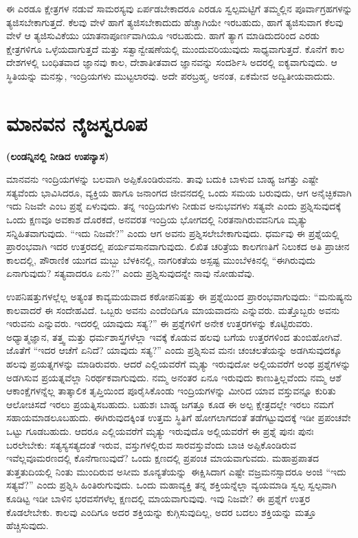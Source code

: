 ಈ ಎರಡೂ ಕ್ಷೇತ್ರಗಳ ನಡುವೆ ಸಾಮರಸ್ಯವು ಏರ್ಪಡಬೇಕಾದರೂ ಎರಡೂ ಸ್ವಲ್ಪಮಟ್ಟಿಗೆ ತಮ್ಮಲ್ಲಿನ ಪೂರ್ವಾಗ್ರಹಗಳನ್ನು ತ್ಯಜಿಸಬೇಕಾಗುತ್ತದೆ. ಕೆಲವು ವೇಳೆ ಹಾಗೆ ತ್ಯಜಿಸಬೇಕಾದುದು ಹೆಚ್ಚಾಗಿಯೇ ಇರಬಹುದು, ಹಾಗೆ ತ್ಯಜಿಸುವಾಗ ಕೆಲವು ವೇಳೆ ಆ ತ್ಯಜಿಸುವಿಕೆಯು ಯಾತನಾಪೂರ್ಣವಾಗಿಯೂ ಇರಬಹುದು. ಹಾಗೆ ತ್ಯಾಗ ಮಾಡಿದುದರಿಂದ ಎರಡು ಕ್ಷೇತ್ರಗಳಿಗೂ ಒಳ್ಳೆಯದಾಗುತ್ತದೆ ಮತ್ತು ಸತ್ವಾನ್ವೇಷಣೆಯಲ್ಲಿ ಮುಂದುವರಿಯುವುದು ಸಾಧ್ಯವಾಗುತ್ತದೆ. ಕೊನೆಗೆ ಕಾಲ ದೇಶಗಳಲ್ಲಿ ಬಂಧಿತವಾದ ಜ್ಞಾನವು ಕಾಲ, ದೇಶಾತೀತವಾದ ಜ್ಞಾನವನ್ನು ಸಂದರ್ಶಿಸಿ ಅದರಲ್ಲಿ ಐಕ್ಯವಾಗುವುದು. ಆ ಸ್ಥಿತಿಯನ್ನು ಮನಸ್ಸು, ಇಂದ್ರಿಯಗಳು ಮುಟ್ಟಲಾರವು. ಅದೇ ಪರಬ್ರಹ್ಮ, ಅನಂತ, ಏಕಮೇವ ಅದ್ವಿತೀಯವಾದುದು.

\chapter{ಮಾನವನ ನೈಜಸ್ವರೂಪ}%

\centerline{\textbf{(ಲಂಡನ್ನಿನಲ್ಲಿ ನೀಡಿದ ಉಪನ್ಯಾಸ)}}

ಮಾನವನು ಇಂದ್ರಿಯಗಳನ್ನು ಬಲವಾಗಿ ಅಪ್ಪಿಕೊಂಡಿರುವನು. ತಾವು ಬದುಕಿ ಬಾಳುವ ಬಾಹ್ಯ ಜಗತ್ತು ಎಷ್ಟೇ ಸತ್ಯವೆಂದು ಭಾವಿಸಿದರೂ, ವ್ಯಕ್ತಿಯ ಹಾಗೂ ಜನಾಂಗದ ಜೀವನದಲ್ಲಿ ಒಂದು ಸಮಯ ಬರುವುದು, ಆಗ ಅನೈಚ್ಛಿಕವಾಗಿ ಇದು ನಿಜವೇ ಎಂಬ ಪ್ರಶ್ನೆ ಏಳುವುದು. ತನ್ನ ಇಂದ್ರಿಯಗಳು ನೀಡುವ ಅನುಭವಗಳು ಸತ್ಯವೇ ಎಂದು ಪ್ರಶ್ನಿಸುವುದಕ್ಕೆ ಒಂದು ಕ್ಷಣವೂ ಅವಕಾಶ ದೊರಕದೆ, ಅನವರತ ಇಂದ್ರಿಯ ಭೋಗದಲ್ಲಿ ನಿರತನಾಗಿರುವವನಿಗೂ ಮೃತ್ಯು ಸನ್ನಿಹಿತವಾಗುವುದು. “ಇದು ನಿಜವೇ?” ಎಂದು ಆಗ ಅವನು ಪ್ರಶ್ನಿಸಲೇಬೇಕಾಗುವುದು. ಧರ್ಮವು ಈ ಪ್ರಶ್ನೆಯಲ್ಲಿ ಪ್ರಾರಂಭವಾಗಿ ಇದರ ಉತ್ತರದಲ್ಲಿ ಪರ್ಯವಸಾನವಾಗುವುದು. ಲಿಖಿತ ಚರಿತ್ರೆಯ ಕಾಲಗಣತಿಗೆ ನಿಲುಕದ ಅತಿ ಪ್ರಾಚೀನ ಕಾಲದಲ್ಲಿ, ಪೌರಾಣಿಕ ಯುಗದ ಮಬ್ಬು ಬೆಳಕಿನಲ್ಲಿ, ನಾಗರಿಕತೆಯ ಅಸ್ಪಷ್ಟ ಮುಂಬೆಳಕಿನಲ್ಲಿ “ಈಗಿರುವುದು ಏನಾಗುವುದು? ಸತ್ಯವಾದರೂ ಏನು?” ಎಂದು ಪ್ರಶ್ನಿಸುವುದನ್ನೇ ನಾವು ನೋಡುವೆವು.

ಉಪನಿಷತ್ತುಗಳಲ್ಲೆಲ್ಲ ಅತ್ಯಂತ ಕಾವ್ಯಮಯವಾದ ಕಠೋಪನಿಷತ್ತು ಈ ಪ್ರಶ್ನೆಯಿಂದ ಪ್ರಾರಂಭವಾಗುವುದು: “ಮನುಷ್ಯನು ಕಾಲವಾದರೆ ಈ ಸಂದೇಹವಿದೆ. ಒಬ್ಬರು ಅವನು ಎಂದೆಂದಿಗೂ ಮಾಯವಾದನು ಎನ್ನುವರು. ಮತ್ತೊಬ್ಬರು ಅವನು ಇರುವನು ಎನ್ನುವರು. ಇದರಲ್ಲಿ ಯಾವುದು ಸತ್ಯ?” ಈ ಪ್ರಶ್ನೆಗಳಿಗೆ ಅನೇಕ ಉತ್ತರಗಳನ್ನು ಕೊಟ್ಟಿರುವರು. ಅಧ್ಯಾತ್ಮಜ್ಞಾನ, ತತ್ತ್ವ ಮತ್ತು ಧರ್ಮಶಾಸ್ತ್ರಗಳೆಲ್ಲಾ ಇವಕ್ಕೆ ಕೊಡುವ ಹಲವು ಬಗೆಯ ಉತ್ತರಗಳಿಂದ ತುಂಬಿಹೋಗಿವೆ. ಜೊತೆಗೆ “ಇದರ ಆಚೆಗೆ ಏನಿದೆ? ಯಾವುದು ಸತ್ಯ?” ಎಂದು ಪ್ರಶ್ನಿಸುವ ಮನಃ ಚಂಚಲತೆಯನ್ನು ಅಡಗಿಸುವುದಕ್ಕೂ ಹಲವು ಪ್ರಯತ್ನಗಳನ್ನು ಮಾಡಿರುವರು. ಆದರೆ ಎಲ್ಲಿಯವರೆಗೆ ಮೃತ್ಯು ಇರುವುದೋ ಅಲ್ಲಿಯವರೆಗೆ ಅಂಥ ಪ್ರಶ್ನೆಗಳನ್ನು ಅಡಗಿಸುವ ಪ್ರಯತ್ನವೆಲ್ಲಾ ನಿರರ್ಥಕವಾಗುವುದು. ನಮ್ಮ ಅನಂತರ ಏನೂ ಇರುವುದು ಕಾಣುತ್ತಿಲ್ಲವೆಂದು ನಮ್ಮ ಆಶೆ ಆಕಾಂಕ್ಷೆಗಳನ್ನೆಲ್ಲ ತಾತ್ಕಾಲಿಕ ತೃಪ್ತಿಯಿಂದ ಪೂರೈಸಿಕೊಂಡು ಇಂದ್ರಿಯಗಳನ್ನು ಮೀರಿದ ಯಾವ ವಸ್ತುವನ್ನೂ ಕುರಿತು ಆಲೋಚಿಸದೆ ಇರಲು ಪ್ರಯತ್ನಿಸಬಹುದು. ಬಹುಶಃ ಬಾಹ್ಯ ಜಗತ್ತೂ ಕೂಡ ಈ ಅಲ್ಪ ಕ್ಷೇತ್ರದಲ್ಲೇ ಇರಲು ನಮಗೆ ಸಹಾಯಮಾಡಲೂಬಹುದು. ಈಗಿರುವುದಕ್ಕಿಂತ ಉತ್ತಮ ಸ್ಥಿತಿಗೆ ಹೋಗಲಾಗದಂತೆ ತಡೆಗಟ್ಟುವುದಕ್ಕೆ ಇಡೀ ಪ್ರಪಂಚವೇ ಒಟ್ಟು ಗೂಡಬಹುದು. ಆದರೂ ಎಲ್ಲಿಯವರೆಗೆ ಮೃತ್ಯು ಇರುವುದೊ ಅಲ್ಲಿಯವರೆಗೆ ಈ ಪ್ರಶ್ನೆ ಪುನಃ ಪುನಃ ಬರಲೇಬೇಕು: ಸತ್ಯಸ್ಯಸತ್ಯದಂತೆ ಇರುವ, ವಸ್ತುಗಳಲ್ಲಿರುವ ಸಾರವಸ್ತುವೆಂದು ಬಾಚಿ ಅಪ್ಪಿಕೊಂಡಿರುವ ಇವೆಲ್ಲವೂ\break ಮರಣದಲ್ಲಿ ಕೊನೆಗಾಣುವುದೆ? ಒಂದು ಕ್ಷಣದಲ್ಲಿ ಪ್ರಪಂಚ ಮಾಯವಾಗುವದು. ಮಹಾಪ್ರಪಾತದ ತುತ್ತತುದಿಯಲ್ಲಿ ನಿಂತು ಮುಂದಿರುವ ಅಸೀಮ ಶೂನ್ಯತೆಯನ್ನು\break\ ಈಕ್ಷಿಸಿದಾಗ ಎಷ್ಟೇ ವಜ್ರಮನಸ್ಸಾದರೂ ಅಂಜಿ “ಇದು ಸತ್ಯವೆ?” ಎಂದು ಪ್ರಶ್ನಿಸಿ ಹಿಂತಿರುಗುವುದು. ಒಂದು ಮಹಾವ್ಯಕ್ತಿ ತನ್ನ ಶಕ್ತಿಯನ್ನೆಲ್ಲಾ ವ್ಯಯಮಾಡಿ ಸ್ವಲ್ಪ ಸ್ವಲ್ಪವಾಗಿ ಕೂಡಿಟ್ಟ ಇಡೀ ಬಾಳಿನ ಭರವಸೆಗಳೆಲ್ಲ ಕ್ಷಣದಲ್ಲಿ ಮಾಯವಾಗುವುವು. ಇವು ನಿಜವೇ? ಈ ಪ್ರಶ್ನೆಗೆ ಉತ್ತರ ಕೊಡಲೇಬೇಕು. ಕಾಲವು ಎಂದಿಗೂ ಅದರ ಶಕ್ತಿಯನ್ನು ಕುಗ್ಗಿಸುವುದಿಲ್ಲ, ಅದರ ಬದಲು ಶಕ್ತಿಯನ್ನು ಮತ್ತೂ ಹೆಚ್ಚಿಸುವುದು.

